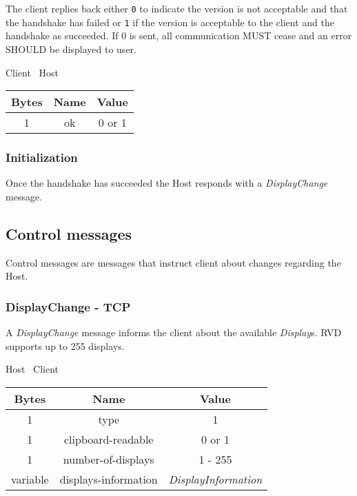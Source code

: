 \documentclass{article}
\begin{document}
    The client replies back either \texttt{0} to indicate the version is not acceptable and that the handshake has
    failed or \texttt{1} if the version is acceptable to the client and the handshake as succeeded. If 0 is sent, all
    communication MUST cease and an error SHOULD be displayed to user.

    \begin{center}
        Client \textrightarrow\ Host\\
        \begin{tabular}{|c|c|c|}
            \hline
            \textbf{Bytes} & \textbf{Name} & \textbf{Value} \\
            \hline
            1              & ok            & 0 or 1         \\
            \hline
        \end{tabular}
    \end{center}

    \subsubsection{Initialization}

    Once the handshake has succeeded the Host responds with a \emph{DisplayChange} message.

    \subsection{Control messages}
    Control messages are messages that instruct client about changes regarding the Host.

    \subsubsection{DisplayChange - TCP}
    A \emph{DisplayChange} message informs the client about the available \emph{Display}s. RVD supports up to 255
    displays.

    \begin{center}
        Host \textrightarrow\ Client\\
        \begin{tabular}{|c|c|c|}
            \hline
            \textbf{Bytes} & \textbf{Name}        & \textbf{Value}            \\
            \hline
            1              & type                 & 1                         \\
            \hline
            1              & clipboard-readable   & 0 or 1                    \\
            \hline
            1              & number-of-displays   & 1 - 255                   \\
            \hline
            variable       & displays-information & \emph{DisplayInformation} \\
            \hline
        \end{tabular}
    \end{center}
\end{document}
